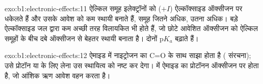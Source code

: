 \begin{solution}{exo:b1:electronic-effects:11}
ऐल्किल समूह इलेक्ट्रॉनों को ($+I$) ऐल्कॉक्साइड ऑक्सीजन पर धकेलते हैं और उसके
आवेश को कम स्थायी बनाते हैं, समूह जितने अधिक, उतना अधिक। बड़े ऐल्कॉक्साइड
जल द्वारा कम अच्छी तरह विलायकित भी होते हैं, जो छोटे आवेशित
ऑक्सीजन को ऐल्किल समूहों के बीच दबे ऑक्सीजन से बेहतर स्थायी बनाता है। दोनों
$\mathrm{p}K_a$ बढ़ाते हैं।
\end{solution}

\begin{solution}{exo:b1:electronic-effects:12}
ऐमाइड में नाइट्रोजन का  C=O के साथ साझा होता है
( संरचना); उसे प्रोटॉन या  के लिए लेना उस
स्थायित्व को नष्ट कर देगा।  में ऐमाइड का प्रोटॉनन
ऑक्सीजन पर होता है, जो आंशिक ऋण आवेश वहन करता है।
\end{solution}

